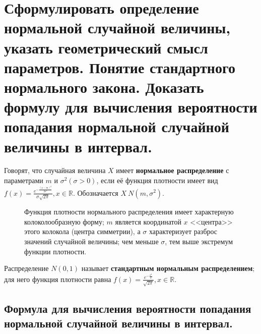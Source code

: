 \section{Сформулировать определение нормальной случайной величины, указать геометрический смысл параметров. Понятие стандартного нормального закона. Доказать формулу для вычисления вероятности попадания нормальной случайной величины в интервал.}

Говорят, что случайная величина $X$ имеет \textbf{нормальное распределение} с параметрами $m$ и $\sigma^2 (\sigma > 0)$, если её функция плотности имеет вид $f(x) = \frac{e^{-\frac{(x-m)^2}{2\sigma^2}}}{\sigma\sqrt{2\pi}}, x \in \mathbb{R}$. Обозначается $X ~ N(m, \sigma^2)$.


\begin{figure}[ht!]
	\begin{minipage}{0.4\textwidth}
	\end{minipage}%
	\hfill
	\begin{minipage}{0.45\textwidth}
		Функция плотности нормального распределения имеет характерную колоколообразную форму; $m$ является координатой $x$ <<центра>> этого колокола (центра симметрии), а $\sigma$ характеризует разброс значений случайной величины; чем меньше $\sigma$, тем выше экстремум функции плотности.
	\end{minipage}
\end{figure}

Распределение $N(0, 1)$ называет \textbf{стандартным нормальным распределением}; для него функция плотности равна $f(x) = \frac{e^{-\frac{x^2}{2}}}{\sqrt{2\pi}}, x \in \mathbb{R}$.

\subsection*{Формула для вычисления вероятности попадания нормальной случайной величины в интервал.}

